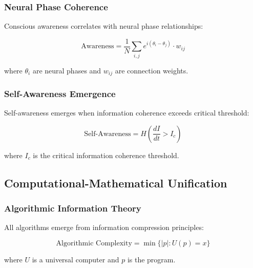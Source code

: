 \subsubsection{Neural Phase Coherence}

\begin{theorem}
Conscious awareness correlates with neural phase relationships:

\begin{equation}
\text{Awareness} = \frac{1}{N} \sum_{i,j} e^{i(\theta_i - \theta_j)} \cdot w_{ij}
\end{equation}

where $\theta_i$ are neural phases and $w_{ij}$ are connection weights.
\end{theorem}

\subsubsection{Self-Awareness Emergence}

\begin{theorem}
Self-awareness emerges when information coherence exceeds critical threshold:

\begin{equation}
\text{Self-Awareness} = H\left( \frac{dI}{dt} > I_c \right)
\end{equation}

where $I_c$ is the critical information coherence threshold.
\end{theorem}

\subsection{Computational-Mathematical Unification}

\subsubsection{Algorithmic Information Theory}

\begin{theorem}
All algorithms emerge from information compression principles:

\begin{equation}
\text{Algorithmic Complexity} = \min \{ |p| : U(p) = x \}
\end{equation}

where $U$ is a universal computer and $p$ is the program.
\end{theorem}

